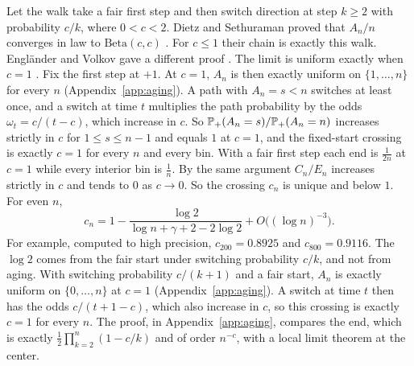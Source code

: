 \begin{remark}[aging]\label{rem:aging}
Let the walk take a fair first step and then switch direction at step $k\ge2$
with probability $c/k$, where $0<c<2$. Dietz and Sethuraman proved that
$A_n/n$ converges in law to $\mathrm{Beta}(c,c)$
\cite[Example~1.1 and Theorem~1.4]{ds2007}. For $c\le1$ their chain is
exactly this walk. Engl\"ander and Volkov gave a different proof
\cite[Theorem~1]{ev2018}. The limit is uniform exactly when $c=1$
\cite[Remark~2]{ev2018}. Fix the first step at $+1$. At $c=1$, $A_n$ is then
exactly uniform on $\{1,\dots,n\}$ for every $n$
(Appendix~\ref{app:aging}). A path with $A_n=s<n$
switches at least once, and a switch at time $t$ multiplies the path
probability by the odds $\omega_t=c/(t-c)$, which increase in $c$. So
$\mathbb{P}_+(A_n=s)/\mathbb{P}_+(A_n=n)$ increases strictly in $c$ for $1\le s\le n-1$
and equals $1$ at $c=1$, and the fixed-start crossing is exactly $c=1$ for
every $n$ and every bin. With a fair first step each end is $\frac1{2n}$ at
$c=1$ while every interior bin is $\frac1n$. By the same argument $C_n/E_n$
increases strictly in $c$ and tends to $0$ as $c\to0$. So the crossing $c_n$
is unique and below $1$. For
even $n$,
\[
 c_n=1-\frac{\log2}{\log n+\gamma+2-2\log2}+O\bigl((\log n)^{-3}\bigr).
\]
For example, computed to high precision, $c_{200}=0.8925$ and
$c_{800}=0.9116$. The $\log2$ comes from the fair start under switching
probability $c/k$, and not from aging. With switching probability $c/(k+1)$
and a fair start, $A_n$ is exactly uniform on $\{0,\dots,n\}$ at $c=1$
(Appendix~\ref{app:aging}). A switch at time $t$ then has the odds
$c/(t+1-c)$, which also increase in $c$, so this crossing is exactly $c=1$
for every $n$. The proof, in Appendix~\ref{app:aging}, compares
the end, which is exactly $\frac12\prod_{k=2}^n(1-c/k)$ and of order $n^{-c}$,
with a local limit theorem at the center.
\end{remark}
